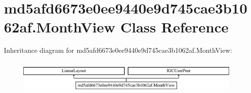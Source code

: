 \hypertarget{classmd5afd6673e0ee9440e9d745cae3b1062af_1_1MonthView}{}\section{md5afd6673e0ee9440e9d745cae3b1062af.\+Month\+View Class Reference}
\label{classmd5afd6673e0ee9440e9d745cae3b1062af_1_1MonthView}
Inheritance diagram for md5afd6673e0ee9440e9d745cae3b1062af.\+Month\+View\+:\begin{figure}[H]
\begin{center}
\leavevmode
\includegraphics[height=1.707317cm]{classmd5afd6673e0ee9440e9d745cae3b1062af_1_1MonthView}
\end{center}
\end{figure}
